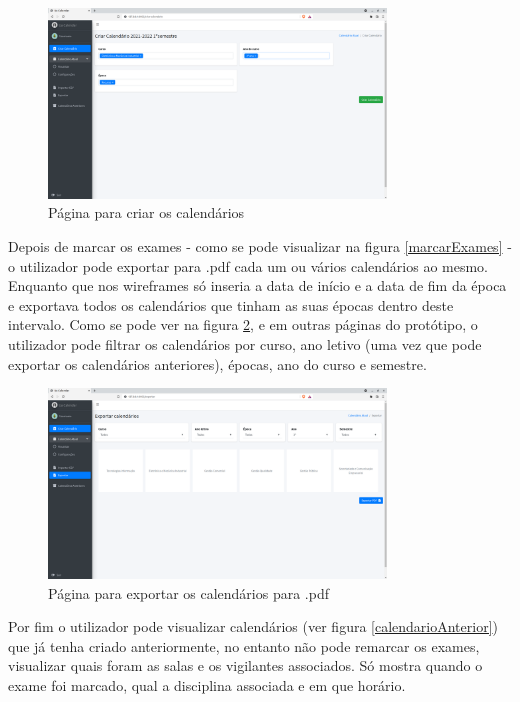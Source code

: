 \documentclass[11pt, twoside]{report}
\begin{document}
	
	 \begin{figure}[H] 
	 	\centering 							\includegraphics[width=0.8\textwidth,height=0.8\textheight,keepaspectratio]{image/PrototipoAFNF/criarCalendario}
	 	\caption{Página para criar os calendários}
	 	\label{criarCalendario}
	 \end{figure}
 
 	Depois de marcar os exames - como se pode visualizar na figura \ref{marcarExames} - o utilizador pode exportar para .pdf cada um ou vários calendários ao mesmo. Enquanto que nos wireframes só inseria a data de início e a data de fim da época e exportava todos os calendários que tinham as suas épocas dentro deste intervalo. Como se pode ver na figura \ref{exportarPDF}, e em outras páginas do protótipo, o utilizador pode filtrar os calendários por curso, ano letivo (uma vez que pode exportar os calendários anteriores), épocas, ano do curso e semestre. 
 	
 	 \begin{figure}[H] 
 		\centering 							\includegraphics[width=0.8\textwidth,height=0.8\textheight,keepaspectratio]{image/PrototipoAFNF/ExportarPdf}
 		\caption{Página para exportar os calendários para .pdf }
 		\label{exportarPDF}
 	\end{figure}
 	
 	
 	Por fim o utilizador pode visualizar calendários (ver figura \ref{calendarioAnterior}) que já tenha criado anteriormente, no entanto não pode remarcar os exames, visualizar quais foram as salas e os vigilantes associados. Só mostra quando o exame foi marcado, qual a disciplina associada e em que horário. 
	
\end{document}
